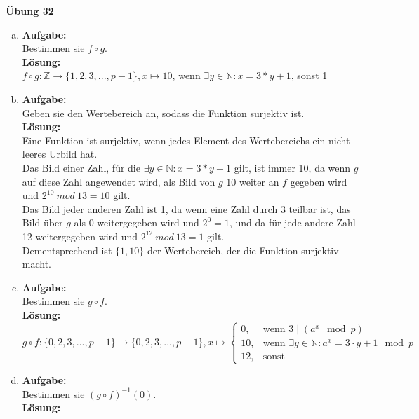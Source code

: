 \documentclass[11pt, a4paper]{article}
\newcommand{\aufgabennr}{32}
\begin{document}
{\center\large\bfseries Übung \aufgabennr\\}

\begin{enumerate}[(a)]
    \item {\bfseries Aufgabe:\\}
    Bestimmen sie $f \circ g$.\\
    {\bfseries Lösung:\\}
    $f \circ g: \mathbb{Z} \rightarrow \{1,2,3,...,p - 1\}, x \mapsto 10$, wenn $\exists y \in \mathbb{N}: x = 3*y + 1$, sonst 1\\
    \item {\bfseries Aufgabe:\\}
    Geben sie den Wertebereich an, sodass die Funktion surjektiv ist.\\
    {\bfseries Lösung:\\}
    Eine Funktion ist surjektiv, wenn jedes Element des Wertebereichs ein nicht leeres Urbild hat.\\
    Das Bild einer Zahl, für die $\exists y \in \mathbb{N}: x = 3*y + 1$ gilt, ist immer 10, da wenn $g$ auf diese Zahl angewendet wird, als Bild von $g$ 10 weiter an $f$ gegeben wird und $2^{10}\ mod\ 13 = 10$ gilt.\\
    Das Bild jeder anderen Zahl ist 1, da wenn eine Zahl durch 3 teilbar ist, das Bild über $g$ als 0 weitergegeben wird und $2^0 = 1$, und da für jede andere Zahl 12 weitergegeben wird und $2^{12}\ mod\ 13 = 1$ gilt.\\
    Dementsprechend ist $\{1, 10\}$ der Wertebereich, der die Funktion surjektiv macht.
    \item {\bfseries Aufgabe:\\}
    Bestimmen sie $g \circ f$.\\
    {\bfseries Lösung:\\}
    $g \circ f: \{0,2,3,...,p-1\} \rightarrow \{0,2,3,...,p-1\}, x \mapsto \begin{cases} 0, & \text{wenn } 3 \mid (a^x \mod p) \\ 10, & \text{wenn } \exists y \in \mathbb{N} : a^x = 3 \cdot y + 1 \mod p \\ 12, & \text{sonst} \end{cases}$\\
    \item {\bfseries Aufgabe:\\}
    Bestimmen sie $(g \circ f)^{-1}(0)$.\\
    {\bfseries Lösung:\\}

\end{enumerate}
\end{document}
